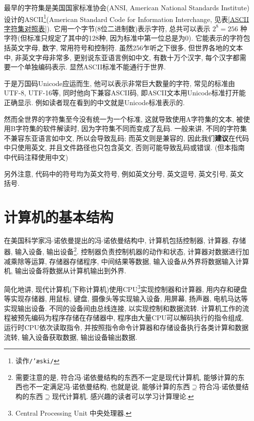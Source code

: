         最早的字符集是美国国家标准协会(ANSI, American National Standards Institute)设计的ASCII\footnote{读作\texttt{/'æski/}}(American Standard Code for Information Interchange, 见表\ref{ASCII字符集对照表}). 它用一个字节(8位二进制数)表示字符, 总共可以表示 $ 2 ^ 8 = 256 $ 种字符(但标准只规定了其中的128种, 因为标准中第一位总是为0). 它能表示的字符包括英文字母, 数字, 常用符号和控制符. 虽然256乍听之下很多, 但世界各地的文本中, 非英文字母非常多, 更别说东亚语言例如中文, 有数十万个汉字, 每个汉字都需要一个单独编码表示. 显然ASCII标准不能通行于世界.

        于是万国码Unicode应运而生, 他可以表示非常巨大数量的字符, 常见的标准由UTF-8, UTF-16等, 同时他向下兼容ASCII码, 即ASCII文本用Unicode标准打开能正确显示. 例如读者现在看到的中文就是Unicode标准表示的.

        然而全世界的字符集至今没有统一为一个标准, 这就导致使用A字符集的文本, 被使用B字符集的软件解读时, 因为字符集不同而变成了乱码. 一般来讲, 不同的字符集不兼容东亚语言如中文, 所以会导致乱码; 而英文则是兼容的, 因此我们\textbf{建议}在代码中只使用英文, 并且文件路径也只包含英文, 否则可能导致乱码或错误. (但本指南中代码注释使用中文)

        另外注意, 代码中的符号均为英文符号, 例如英文分号, 英文逗号, 英文引号, 英文括号.

    \section{计算机的基本结构} \label{计算机的基本结构}
        在美国科学家冯$\cdot$诺依曼提出的冯$\cdot$诺依曼结构中, 计算机包括控制器, 计算器, 存储器, 输入设备, 输出设备\footnote{需要注意的是, 符合冯$\cdot$诺依曼结构的东西不一定是现代计算机, 能够计算的东西也不一定满足冯$\cdot$诺依曼结构, 也就是说, 能够计算的东西$\supseteq$符合冯$\cdot$诺依曼结构的东西$\supseteq$现代计算机. 感兴趣的读者可以学习计算理论.}. 控制器负责控制机器的动作和状态, 计算器对数据进行加减乘除等运算, 存储器存储程序, 中间结果等数据, 输入设备从外界将数据输入计算机, 输出设备将数据从计算机输出到外界.
        
        简化地讲, 现代计算机(下称计算机)使用CPU\footnote{Central Processing Unit 中央处理器.}实现控制器和计算器, 用内存和硬盘等实现存储器, 用鼠标, 键盘, 摄像头等实现输入设备, 用屏幕, 扬声器, 电机马达等实现输出设备. 不同的设备间由总线连接, 以实现控制和数据流转. 计算机工作的流程被预先编码为程序存储在存储器中, 程序由大量CPU可以解码执行的指令组成, 运行时CPU依次读取指令, 并按照指令命令计算器和存储设备执行各类计算和数据流转, 输入设备获取数据, 输出设备输出数据.

